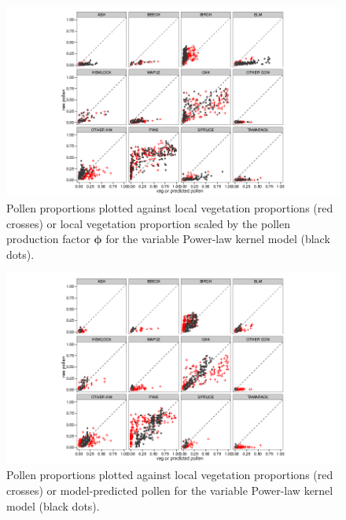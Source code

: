 \begin{figure}
\centering
\includegraphics[width=7in]{figures/pollen_phi_scaled_pl_Ka_Kgamma.png}
\caption{Pollen proportions plotted against local vegetation
  proportions (red crosses) or local vegetation proportion scaled by
  the pollen production factor $\bm{\phi}$ for the variable Power-law
  kernel model (black dots).}
\label{fig:focal_scaled}
\end{figure}

\begin{figure}
\centering
\includegraphics[width=7in]{figures/pollen_preds_pl_Ka_Kgamma.png}
\caption{Pollen proportions plotted against local vegetation
  proportions (red crosses) or model-predicted pollen for the variable
  Power-law kernel model (black dots).}
\label{fig:preds}
\end{figure}

